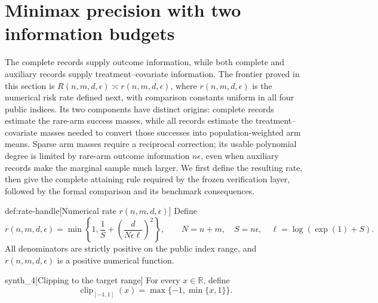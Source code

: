 \section{Minimax precision with two information budgets}

The complete records supply outcome information, while both complete and auxiliary records supply treatment--covariate information. The frontier proved in this section is \(R(n,m,d,\epsilon)\asymp r(n,m,d,\epsilon)\), where \(r(n,m,d,\epsilon)\) is the numerical risk rate defined next, with comparison constants uniform in all four public indices. Its two components have distinct origins: complete records estimate the rare-arm success masses, while all records estimate the treatment--covariate masses needed to convert those successes into population-weighted arm means. Sparse arm masses require a reciprocal correction; its usable polynomial degree is limited by rare-arm outcome information \(n\epsilon\), even when auxiliary records make the marginal sample much larger. We first define the resulting rate, then give the complete attaining rule required by the frozen verification layer, followed by the formal comparison and its benchmark consequences.

\begin{definitionv}{def:rate-handle}[Numerical rate $r(n,m,d,\epsilon)$]
Define
\[
r(n,m,d,\epsilon)
=
\min\left\{
1,\frac1S+\left(\frac d{N\epsilon\ell}\right)^2
\right\},
\qquad
N=n+m,\quad S=n\epsilon,\quad
\ell=\log(\exp(1)+S).
\]
All denominators are strictly positive on the public index range, and \(r(n,m,d,\epsilon)\) is a positive numerical function.
\end{definitionv}

\begin{definitionv}{synth_4}[Clipping to the target range]
For every \(x\in\mathbb R\), define
\[
\operatorname{clip}_{[-1,1]}(x)=\max\{-1,\min\{x,1\}\}.
\]
\end{definitionv}

